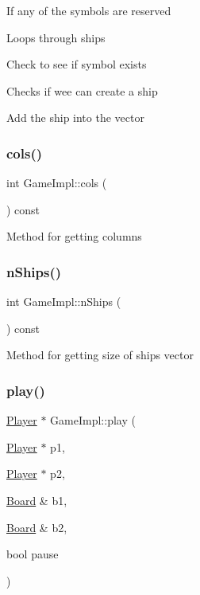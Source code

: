 If any of the symbols are reserved

Loops through ships

Check to see if symbol exists

Checks if wee can create a ship

Add the ship into the vector \mbox{\label{class_game_impl_a73a94a0378afbe0ae9369afcdabc51ab}} 
\subsubsection{\texorpdfstring{cols()}{cols()}}
{\footnotesize\ttfamily int Game\+Impl\+::cols (\begin{DoxyParamCaption}{ }\end{DoxyParamCaption}) const}

Method for getting columns \mbox{\label{class_game_impl_a15bfe27ab66ca758afaed1cc805c2f10}} 
\subsubsection{\texorpdfstring{n\+Ships()}{nShips()}}
{\footnotesize\ttfamily int Game\+Impl\+::n\+Ships (\begin{DoxyParamCaption}{ }\end{DoxyParamCaption}) const}

Method for getting size of ships vector \mbox{\label{class_game_impl_adf2cc88e7c3f617a7033512d05a6ba0c}} 
\subsubsection{\texorpdfstring{play()}{play()}}
{\footnotesize\ttfamily \mbox{\hyperlink{class_player}{Player}} $\ast$ Game\+Impl\+::play (\begin{DoxyParamCaption}\item[{\mbox{\hyperlink{class_player}{Player}} $\ast$}]{p1,  }\item[{\mbox{\hyperlink{class_player}{Player}} $\ast$}]{p2,  }\item[{\mbox{\hyperlink{class_board}{Board}} \&}]{b1,  }\item[{\mbox{\hyperlink{class_board}{Board}} \&}]{b2,  }\item[{bool}]{pause }\end{DoxyParamCaption})}

